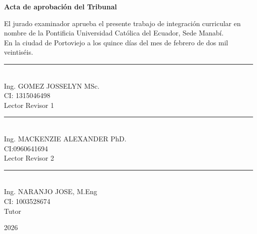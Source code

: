 
\clearpage
    \thispagestyle{plain}

    \begin{center}
        \vspace*{1.7cm}
        \textbf{Acta de aprobación del Tribunal}

        \vspace{0.8cm}
        \raggedright
        
        El jurado examinador aprueba el presente trabajo de integración curricular en nombre de la Pontificia Universidad Católica del Ecuador, Sede Manabí.\\
        En la ciudad de Portoviejo a los quince días del mes de febrero de dos mil veintiséis.
        \par
        \vspace{3.0cm}
        \centering

        \begin{minipage}{0.45\textwidth}
            \centering
            \rule{5cm}{0.4pt} \\ 
           Ing. GOMEZ JOSSELYN MSc.\\
            CI: 1315046498\\
            Lector Revisor 1
        \end{minipage}
        \hfill
        \begin{minipage}{0.45\textwidth}
            \centering
            \rule{5cm}{0.4pt} \\ 
            Ing. MACKENZIE ALEXANDER PhD.\\
            CI:0960641694\\
            Lector Revisor 2
        \end{minipage}
        \vspace{2.0cm}

        \rule{7cm}{0.4pt} \\ %
        Ing. NARANJO JOSE, M.Eng\\
        CI: 1003528674\\
        Tutor

        

        \vspace{2.0cm}

        2026
    \end{center}
\clearpage
